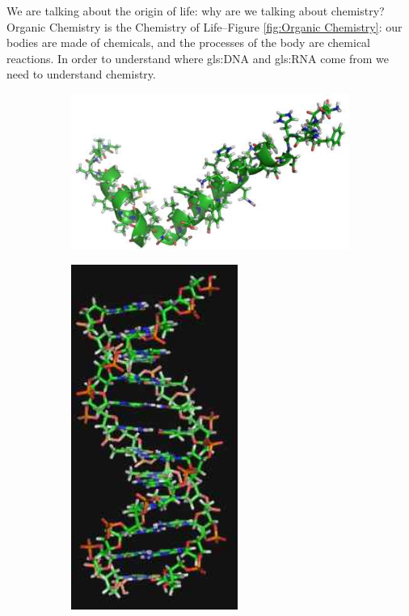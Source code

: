 \documentclass[]{article}
\begin{document}
We are talking about the origin of life: why are we talking about chemistry? Organic Chemistry is the Chemistry of Life--Figure \ref{fig:Organic Chemistry}: our bodies are made of chemicals, and the processes of the body are chemical reactions. In order to understand where \gls{gls:DNA} and \gls{gls:RNA} come from we need to understand chemistry.


\begin{figure}[H]
	\caption {Organic Chemistry is the Chemistry of Life}\label{fig:Organic Chemistry}
	\begin{subfigure}[b]{0.55\textwidth}
		\includegraphics[width=\textwidth]{OrgChem1}
	\end{subfigure}
	\;
	\begin{subfigure}[b]{0.35\textwidth}
		\includegraphics[width=0.6\textwidth]{OrgChem2}
	\end{subfigure}
\end{figure}
\end{document}
